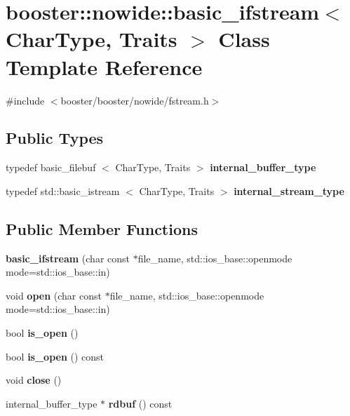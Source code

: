 \section{booster\-:\-:nowide\-:\-:basic\-\_\-ifstream$<$ \-Char\-Type, \-Traits $>$ \-Class \-Template \-Reference}
\label{classbooster_1_1nowide_1_1basic__ifstream}


{\ttfamily \#include $<$booster/booster/nowide/fstream.\-h$>$}

\subsection*{\-Public \-Types}
\begin{DoxyCompactItemize}
\item 
typedef basic\-\_\-filebuf\*
$<$ \-Char\-Type, \-Traits $>$ {\bfseries internal\-\_\-buffer\-\_\-type}\label{classbooster_1_1nowide_1_1basic__ifstream_a69bfa84177d7a4d357958164a2015b3c}

\item 
typedef std\-::basic\-\_\-istream\*
$<$ \-Char\-Type, \-Traits $>$ {\bfseries internal\-\_\-stream\-\_\-type}\label{classbooster_1_1nowide_1_1basic__ifstream_a9baee407ad1c3fd5ac837b206ed122c8}

\end{DoxyCompactItemize}
\subsection*{\-Public \-Member \-Functions}
\begin{DoxyCompactItemize}
\item 
{\bfseries basic\-\_\-ifstream} (char const $\ast$file\-\_\-name, std\-::ios\-\_\-base\-::openmode mode=std\-::ios\-\_\-base\-::in)\label{classbooster_1_1nowide_1_1basic__ifstream_a349a1df7d87c85422e67574d8d0f17ab}

\item 
void {\bfseries open} (char const $\ast$file\-\_\-name, std\-::ios\-\_\-base\-::openmode mode=std\-::ios\-\_\-base\-::in)\label{classbooster_1_1nowide_1_1basic__ifstream_a09b6a2cb66805759abd7c130e18b5896}

\item 
bool {\bfseries is\-\_\-open} ()\label{classbooster_1_1nowide_1_1basic__ifstream_a5ab0ecf734809cf43f3753783e797357}

\item 
bool {\bfseries is\-\_\-open} () const \label{classbooster_1_1nowide_1_1basic__ifstream_aaba31ae640976c974c60f1e560379007}

\item 
void {\bfseries close} ()\label{classbooster_1_1nowide_1_1basic__ifstream_af39fe9e62c854ea5ba2333d469a6cf79}

\item 
internal\-\_\-buffer\-\_\-type $\ast$ {\bfseries rdbuf} () const \label{classbooster_1_1nowide_1_1basic__ifstream_a1ac8e4f67a2f66b6be0ac15a20c078ae}

\end{DoxyCompactItemize}


